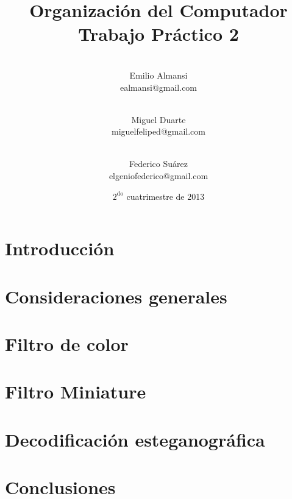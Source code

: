 \documentclass[10pt, a4paper]{article}
\newcommand{\RNum}[1]{\uppercase\expandafter{\romannumeral #1\relax}}
\begin{document}
\setlength{\parindent}{25pt}

	
	\thispagestyle{empty}
	\title{%
	\huge{Organización del Computador \RNum{2}}\\
	\vspace{4mm}
	\large{Trabajo Práctico 2}
	}
	\date{\vspace{5mm}$2^{\mathrm{do}}$ cuatrimestre de 2013}

	\author{
		\\
		{\rm Emilio Almansi }\\
		\small{ealmansi@gmail.com}
		\and
		\\
		{\rm Miguel Duarte}\\
		\small{miguelfeliped@gmail.com}
		\and
		\\
		{\rm Federico Suárez}\\
		\small{elgeniofederico@gmail.com}
	} %
	\maketitle

	
	\vspace{10mm}
	\begin{abstract}
	\end{abstract}
	\vspace{10mm}


	\tableofcontents

	\newpage
	\section{Introducción}
		
	\newpage

	\section{Consideraciones generales}
		
	\newpage

	\section{Filtro de color}
		
	\newpage

	\section{Filtro Miniature}
		
	\newpage

	\section{Decodificación esteganográfica}
		
	\newpage

	\section{Conclusiones}
		

	
\end{document}
